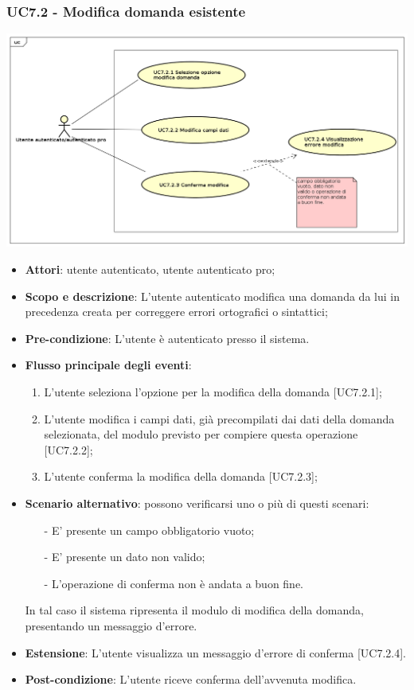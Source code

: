 	\subsubsection{UC7.2 - Modifica domanda esistente}
	\begin{center}
		\includegraphics[scale=0.5]{UML/UC7.2.png}
	\end{center}
	\begin{itemize}
		\item
			\textbf{Attori}: utente autenticato, utente autenticato pro;
		\item		
			\textbf{Scopo e descrizione}: L'utente autenticato modifica una domanda da lui in precedenza creata per correggere errori ortografici o sintattici;
		\item
			\textbf{Pre-condizione}: L'utente è autenticato presso il sistema. 
		\item
			\textbf{Flusso principale degli eventi}:
	       		\begin{enumerate}
					\item 	
					L'utente seleziona l'opzione per la modifica della domanda [UC7.2.1];
					\item
					L'utente modifica i campi dati, già precompilati dai dati della domanda selezionata, del modulo previsto per compiere questa operazione [UC7.2.2];
					\item
					L'utente conferma la modifica della domanda [UC7.2.3];
	 			\end{enumerate}
	 	\item
	 		\textbf{Scenario alternativo}: possono verificarsi uno o più di questi scenari:
				\begin{itemize}
					\item[-] 	
						E' presente un campo obbligatorio vuoto;
					\item[-] 
    						E' presente  un dato non valido;
					\item[-] 
						L'operazione di conferma non è andata a buon fine.
				\end{itemize}
			In tal caso il sistema ripresenta il modulo di modifica della domanda, presentando un messaggio d'errore.
		\item
			\textbf{Estensione}: L'utente visualizza un messaggio d'errore di conferma [UC7.2.4].
		\item
			\textbf{	Post-condizione}: L'utente riceve conferma dell'avvenuta modifica.
	\end{itemize}
